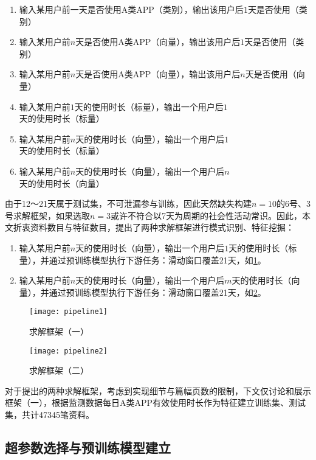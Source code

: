 \documentclass[withoutpreface,bwprint]{cumcmthesis}
\begin{document}
\begin{enumerate}
    \item 输入某用户前一天是否使用A类APP（类别），输出该用户后$1$天是否使用（类别）
    \item 输入某用户前$n$天是否使用A类APP（向量），输出该用户后$1$天是否使用（类别）
    \item 输入某用户前$n$天是否使用A类APP（向量），输出该用户后$n$天是否使用（向量）
    \item 输入某用户前$1$天的使用时长（标量），输出一个用户后$1$天的使用时长（标量）
    \item 输入某用户前$n$天的使用时长（向量），输出一个用户后$1$天的使用时长（标量）
    \item 输入某用户前$n$天的使用时长（向量），输出一个用户后$n$天的使用时长（向量）
\end{enumerate}

由于12～21天属于测试集，不可泄漏参与训练，因此天然缺失构建$n=10$的6号、3号求解框架，如果选取$n=3$或许不符合以7天为周期的社会性活动常识。因此，本文折衷资料数目与特征数目，提出了两种求解框架进行模式识别、特征挖掘：
\begin{enumerate}
    \item 输入某用户前$n$天的使用时长（向量），输出一个用户后$1$天的使用时长（标量），并通过预训练模型执行下游任务：滑动窗口覆盖21天，如\cref{fig:pipeline1}。
    \item 输入某用户前$n$天的使用时长（向量），输出一个用户后$m$天的使用时长（向量），并通过预训练模型执行下游任务：滑动窗口覆盖21天，如\cref{fig:pipeline2}。
\end{enumerate}

\begin{figure}[!htbp]
    \centering
    \texttt{[image: pipeline1]}
    \caption{求解框架（一）}
    \label{fig:pipeline1}
\end{figure}

\begin{figure}[!htbp]
    \centering
    \texttt{[image: pipeline2]}
    \caption{求解框架（二）}
    \label{fig:pipeline2}
\end{figure}

对于提出的两种求解框架，考虑到实现细节与篇幅页数的限制，下文仅讨论和展示框架（一），根据监测数据每日A类APP有效使用时长作为特征建立训练集、测试集，共计47345笔资料。

\subsection{超参数选择与预训练模型建立}
\end{document}
